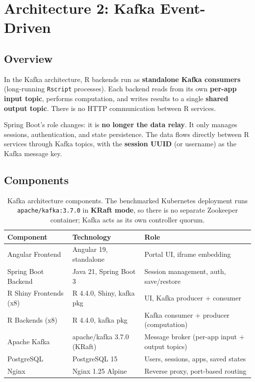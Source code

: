 \documentclass[12pt,a4paper]{article}
\begin{document}
\section{Architecture 2: Kafka Event-Driven}

\subsection{Overview}

In the Kafka architecture, R backends run as \textbf{standalone Kafka consumers} (long-running \texttt{Rscript} processes). Each backend reads from its own \textbf{per-app input topic}, performs computation, and writes results to a single \textbf{shared output topic}. There is no HTTP communication between R services.

Spring Boot's role changes: it is \textbf{no longer the data relay}. It only manages sessions, authentication, and state persistence. The data flows directly between R services through Kafka topics, with the \textbf{session UUID} (or username) as the Kafka message key.

\subsection{Components}

\begin{table}[h]
\centering
\small
\begin{tabular}{@{}lll@{}}
\toprule
\textbf{Component} & \textbf{Technology} & \textbf{Role} \\
\midrule
Angular Frontend & Angular 19, standalone & Portal UI, iframe embedding \\
Spring Boot Backend & Java 21, Spring Boot 3 & Session management, auth, save/restore \\
R Shiny Frontends (x8) & R 4.4.0, Shiny, kafka pkg & UI, Kafka producer + consumer \\
R Backends (x8) & R 4.4.0, kafka pkg & Kafka consumer + producer (computation) \\
Apache Kafka & apache/kafka 3.7.0 (KRaft) & Message broker (per-app input + output topics) \\
PostgreSQL & PostgreSQL 15 & Users, sessions, apps, saved states \\
Nginx & Nginx 1.25 Alpine & Reverse proxy, port-based routing \\
\bottomrule
\end{tabular}
\caption{Kafka architecture components. The benchmarked Kubernetes deployment runs \texttt{apache/kafka:3.7.0} in \textbf{KRaft mode}, so there is no separate Zookeeper container; Kafka acts as its own controller quorum.}
\end{table}
\end{document}
